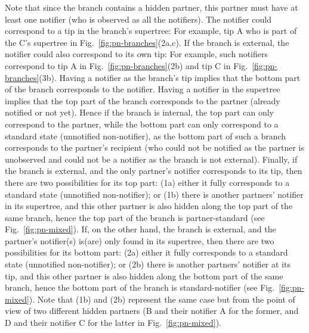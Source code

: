 \documentclass[10pt,letterpaper]{article}
\begin{document}
Note that since the branch contains a hidden partner, this partner must have at least one notifier (who is observed as all the notifiers).  The notifier could correspond to a tip in the branch's supertree: For example, tip A who is part of the C's supertree in Fig.~\ref{fig:pn-branches}(2a,c). If the branch is external, the notifier could also correspond to its own tip: For example, such notifiers correspond to tip A in Fig.~\ref{fig:pn-branches}(2b) and tip C in Fig.~\ref{fig:pn-branches}(3b).
Having a notifier as the branch's tip implies that the bottom part of the branch corresponds to the notifier. Having a notifier in the supertree implies that the top part of the branch corresponds to the partner (already notified or not yet). Hence if the branch is internal, the top part can only correspond to the partner, while the bottom part can only correspond to a standard state (unnotified non-notifier), as the bottom part of such a branch corresponds to the partner's recipient (who could not be notified as the partner is unobserved and could not be a notifier as the branch is not external). Finally, if the branch is external, and the only partner's notifier corresponds to its tip, then there are two possibilities for its top part: (1a) either it fully corresponds to a standard state (unnotified non-notifier); or (1b) there is another partners' notifier in its supertree, and this other partner is also hidden along the top part of the same branch, hence the top part of the branch is partner-standard (see Fig.~\ref{fig:pn-mixed}). If, on the other hand, the branch is external, and the partner's notifier(s) is(are) only found in its supertree, then there are two possibilities for its bottom part: (2a) either it fully corresponds to a standard state (unnotified non-notifier); or (2b) there is another partners' notifier at its tip, and this other partner is also hidden along the bottom part of the same branch, hence the bottom part of the branch is standard-notifier (see Fig.~\ref{fig:pn-mixed}). Note that (1b) and (2b) represent the same case but from the point of view of two different hidden partners (B and their notifier A for the former, and D and their notifier C for the latter in Fig.~\ref{fig:pn-mixed}).  
\end{document}
